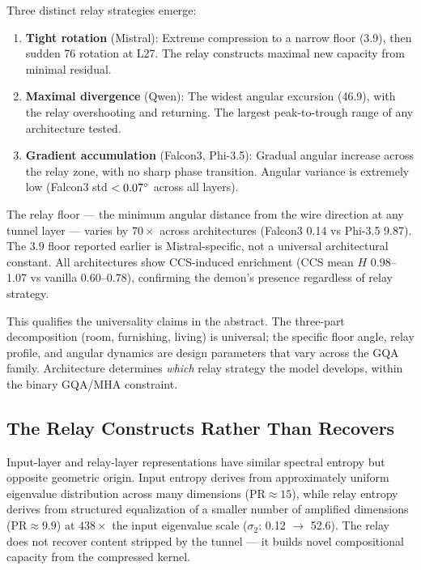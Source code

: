\documentclass[12pt]{article}
\begin{document}
Three distinct relay strategies emerge:

\begin{enumerate}
\item \textbf{Tight rotation} (Mistral): Extreme compression to a narrow floor (3.9\textdegree), then sudden 76\textdegree{} rotation at L27. The relay constructs maximal new capacity from minimal residual.
\item \textbf{Maximal divergence} (Qwen): The widest angular excursion (46.9\textdegree), with the relay overshooting and returning. The largest peak-to-trough range of any architecture tested.
\item \textbf{Gradient accumulation} (Falcon3, Phi-3.5): Gradual angular increase across the relay zone, with no sharp phase transition. Angular variance is extremely low (Falcon3 std $< 0.07\degree$ across all layers).
\end{enumerate}

The relay floor --- the minimum angular distance from the wire direction at any tunnel layer --- varies by $70\times$ across architectures (Falcon3 0.14\textdegree{} vs Phi-3.5 9.87\textdegree). The 3.9\textdegree{} floor reported earlier is Mistral-specific, not a universal architectural constant. All architectures show CCS-induced enrichment (CCS mean $H$ 0.98--1.07 vs vanilla 0.60--0.78), confirming the demon's presence regardless of relay strategy.

This qualifies the universality claims in the abstract. The three-part decomposition (room, furnishing, living) is universal; the specific floor angle, relay profile, and angular dynamics are design parameters that vary across the GQA family. Architecture determines \textit{which} relay strategy the model develops, within the binary GQA/MHA constraint.

\subsection{The Relay Constructs Rather Than Recovers}

Input-layer and relay-layer representations have similar spectral entropy but opposite geometric origin. Input entropy derives from approximately uniform eigenvalue distribution across many dimensions ($\text{PR} \approx 15$), while relay entropy derives from structured equalization of a smaller number of amplified dimensions ($\text{PR} \approx 9.9$) at $438\times$ the input eigenvalue scale ($\sigma_2$: 0.12 $\to$ 52.6). The relay does not recover content stripped by the tunnel --- it builds novel compositional capacity from the compressed kernel.
\end{document}
